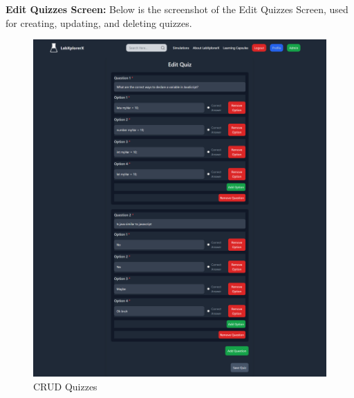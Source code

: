 \textbf{Edit Quizzes Screen:} Below is the screenshot of the Edit Quizzes Screen, used for creating, updating, and deleting quizzes.
\begin{figure}[H]
    \centering
    \includegraphics[width = 16cm]{Diagrams/output/edit_quiz.png}
    \caption{CRUD Quizzes}
\end{figure}
\newpage


